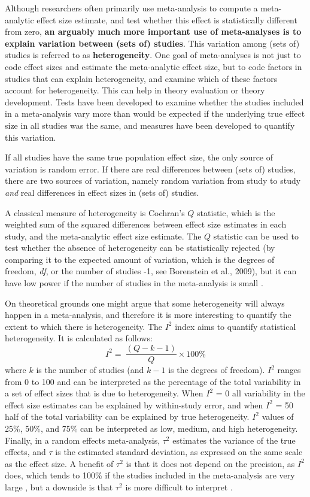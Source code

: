 \documentclass[
  oneside]{krantz}
\begin{document}
Although researchers often primarily use meta-analysis to compute a meta-analytic effect size estimate, and test whether this effect is statistically different from zero, \textbf{an arguably much more important use of meta-analyses is to explain variation between (sets of) studies}. This variation among (sets of) studies is referred to as \textbf{heterogeneity}. One goal of meta-analyses is not just to code effect sizes and estimate the meta-analytic effect size, but to code factors in studies that can explain heterogeneity, and examine which of these factors account for heterogeneity. This can help in theory evaluation or theory development. Tests have been developed to examine whether the studies included in a meta-analysis vary more than would be expected if the underlying true effect size in all studies was the same, and measures have been developed to quantify this variation.

If all studies have the same true population effect size, the only source of variation is random error. If there are real differences between (sets of) studies, there are two sources of variation, namely random variation from study to study \emph{and} real differences in effect sizes in (sets of) studies.

A classical measure of heterogeneity is Cochran's \(Q\) statistic, which is the weighted sum of the squared differences between effect size estimates in each study, and the meta-analytic effect size estimate. The \(Q\) statistic can be used to test whether the absence of heterogeneity can be statistically rejected (by comparing it to the expected amount of variation, which is the degrees of freedom, \emph{df}, or the number of studies -1, see Borenstein et al., 2009), but it can have low power if the number of studies in the meta-analysis is small \citep{huedo-medina_assessing_2006}.

On theoretical grounds one might argue that some heterogeneity will always happen in a meta-analysis, and therefore it is more interesting to quantify the extent to which there is heterogeneity. The \(I^2\) index aims to quantify statistical heterogeneity. It is calculated as follows: \[I^{2} = \ \frac{(Q - k - 1)}{Q} \times 100\%\] where \(k\) is the number of studies (and \(k-1\) is the degrees of freedom). \(I^2\) ranges from 0 to 100 and can be interpreted as the percentage of the total variability in a set of effect sizes that is due to heterogeneity. When \(I^2\) = 0 all variability in the effect size estimates can be explained by within-study error, and when \(I^2\) = 50 half of the total variability can be explained by true heterogeneity. \(I^2\) values of 25\%, 50\%, and 75\% can be interpreted as low, medium, and high heterogeneity. Finally, in a random effects meta-analysis, \(\tau^2\) estimates the variance of the true effects, and \(\tau\) is the estimated standard deviation, as expressed on the same scale as the effect size. A benefit of \(\tau^2\) is that it does not depend on the precision, as \(I^2\) does, which tends to 100\% if the studies included in the meta-analysis are very large \citep{rucker_undue_2008}, but a downside is that \(\tau^2\) is more difficult to interpret \citep{harrer_doing_2021}.
\end{document}
